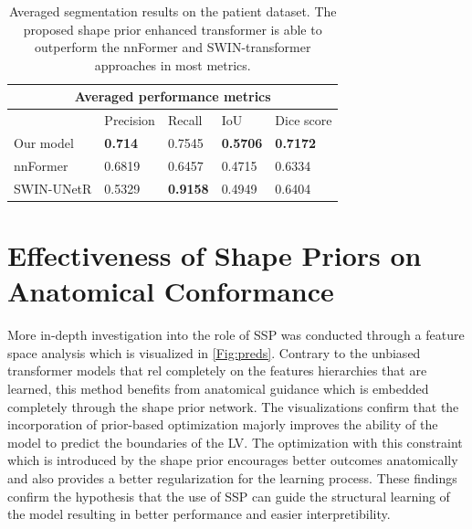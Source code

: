 \begin{table}[h!t]
\begin{tabular}{ |p{2.3cm}|p{2.3cm}|p{2.3cm}|p{2.3cm}|p{2.3cm}|}
\hline
\multicolumn{5}{|c|}{Averaged performance metrics} \\
\hline
& Precision & Recall & IoU & Dice score \\
\hline
Our model & \textbf{0.714} & 0.7545 & \textbf{0.5706} & \textbf{0.7172} \\
\hline
nnFormer & 0.6819 & 0.6457 & 0.4715 & 0.6334 \\
\hline
SWIN-UNetR & 0.5329 & \textbf{0.9158} & 0.4949 & 0.6404 \\
\hline
\end{tabular}
\caption{Averaged segmentation results on the patient dataset. The proposed shape prior enhanced transformer is able to outperform the nnFormer \cite{zhou2023nnformer} and SWIN-transformer \cite{10.1007/978-3-031-08999-2_22} approaches in most metrics.}
\label{tab:quantitative_comparison}
\end{table}

\section{Effectiveness of Shape Priors on Anatomical Conformance}
More in-depth investigation into the role of SSP was conducted through a feature space analysis which is visualized in \cref{Fig:preds}. Contrary to the unbiased transformer models that rel completely on the features hierarchies that are learned, this method benefits from anatomical guidance which is embedded completely through the shape prior network. The visualizations confirm that the incorporation of prior-based optimization majorly improves the ability of the model to predict the boundaries of the LV. The optimization with this constraint which is introduced by the shape prior encourages better outcomes anatomically and also provides a better regularization for the learning process. These findings confirm the hypothesis that the use of SSP can guide the structural learning of the model resulting in better performance and easier interpretibility.

